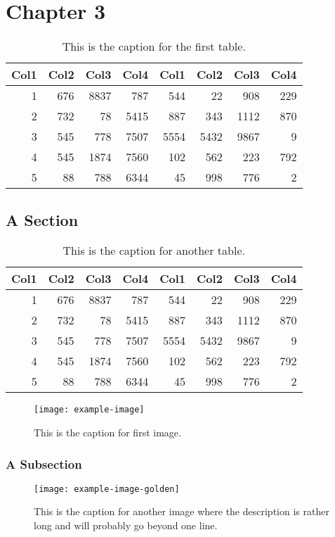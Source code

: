 \chapter{Chapter 3}
\lipsum[1]
\begin{table}
	\centering
	\begin{tabular}{r r r r r r r r}
		Col1 & Col2 & Col3 & Col4 & Col1 & Col2 & Col3 & Col4 \\
		\hline
		1    & 676  & 8837 & 787  & 544  & 22   & 908  & 229  \\
		2    & 732  & 78   & 5415 & 887  & 343  & 1112 & 870  \\
		3    & 545  & 778  & 7507 & 5554 & 5432 & 9867 & 9    \\
		4    & 545  & 1874 & 7560 & 102  & 562  & 223  & 792  \\
		5    & 88   & 788  & 6344 & 45   & 998  & 776  & 2    \\
		\hline
	\end{tabular}
	\caption{This is the caption for the first table.}
\end{table}
\lipsum[2]

\section{A Section}
\lipsum[3]
\begin{table}
	\centering
	\begin{tabular}{r r r r r r r r}
		Col1 & Col2 & Col3 & Col4 & Col1 & Col2 & Col3 & Col4 \\
		\hline
		1    & 676  & 8837 & 787  & 544  & 22   & 908  & 229  \\
		2    & 732  & 78   & 5415 & 887  & 343  & 1112 & 870  \\
		3    & 545  & 778  & 7507 & 5554 & 5432 & 9867 & 9    \\
		4    & 545  & 1874 & 7560 & 102  & 562  & 223  & 792  \\
		5    & 88   & 788  & 6344 & 45   & 998  & 776  & 2    \\
		\hline
	\end{tabular}
	\caption{This is the caption for another table.}
\end{table}
\lipsum[4-5]
\begin{figure}
	\centering
	\texttt{[image: example-image]}
	\caption{This is the caption for first image.}
\end{figure}

\subsection{A Subsection}
\lipsum[6-8]
\begin{figure}
	\centering
	\texttt{[image: example-image-golden]}
	\caption{This is the caption for another image where the description is rather long and will probably go beyond one line.}
\end{figure}

